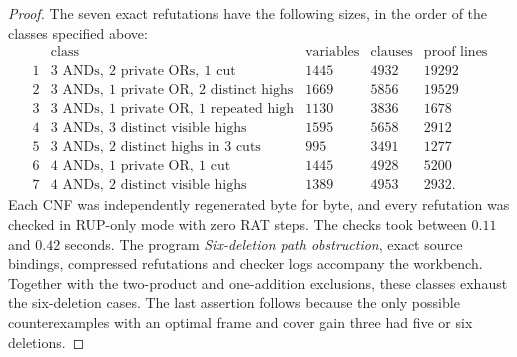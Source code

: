 \begin{proof}
The seven exact refutations have the following sizes, in the order
of the classes specified above:
\[
\begin{array}{c|l|r|r|r}
 &\text{class}&\text{variables}&\text{clauses}&\text{proof lines}\\\hline
1&3\text{ ANDs},\ 2\text{ private ORs},\ 1\text{ cut}&1445&4932&19292\\
2&3\text{ ANDs},\ 1\text{ private OR},\ 2\text{ distinct highs}&1669&5856&19529\\
3&3\text{ ANDs},\ 1\text{ private OR},\ 1\text{ repeated high}&1130&3836&1678\\
4&3\text{ ANDs},\ 3\text{ distinct visible highs}&1595&5658&2912\\
5&3\text{ ANDs},\ 2\text{ distinct highs in }3\text{ cuts}&995&3491&1277\\
6&4\text{ ANDs},\ 1\text{ private OR},\ 1\text{ cut}&1445&4928&5200\\
7&4\text{ ANDs},\ 2\text{ distinct visible highs}&1389&4953&2932.
\end{array}
\]
Each CNF was independently regenerated byte for byte, and every
refutation was checked in RUP-only mode with zero RAT steps. The
checks took between $0.11$ and $0.42$ seconds. The program
\emph{Six-deletion path obstruction}, exact source bindings,
compressed refutations and checker logs accompany the workbench.
Together with the two-product and one-addition exclusions, these
classes exhaust the six-deletion cases. The last assertion follows
because the only possible counterexamples with an optimal frame and
cover gain three had five or six deletions.
\end{proof}
